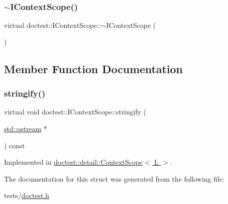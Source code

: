 \subsubsection{\texorpdfstring{$\sim$\+I\+Context\+Scope()}{~IContextScope()}}
{\footnotesize\ttfamily virtual doctest\+::\+I\+Context\+Scope\+::$\sim$\+I\+Context\+Scope (\begin{DoxyParamCaption}{ }\end{DoxyParamCaption})\hspace{0.3cm}{\ttfamily [virtual]}}



\subsection{Member Function Documentation}
\mbox{\label{structdoctest_1_1IContextScope_affbf0f9bf8107a4a8a805d237288141d}} 
\subsubsection{\texorpdfstring{stringify()}{stringify()}}
{\footnotesize\ttfamily virtual void doctest\+::\+I\+Context\+Scope\+::stringify (\begin{DoxyParamCaption}\item[{\hyperlink{doctest_8h_a116af65cb5e924b33ad9d9ecd7a783f3}{std\+::ostream} $\ast$}]{ }\end{DoxyParamCaption}) const\hspace{0.3cm}{\ttfamily [pure virtual]}}



Implemented in \hyperlink{classdoctest_1_1detail_1_1ContextScope_a4636ac32ae41ae108c7ada4a164ffaeb}{doctest\+::detail\+::\+Context\+Scope$<$ L $>$}.



The documentation for this struct was generated from the following file\+:\begin{DoxyCompactItemize}
\item 
tests/\hyperlink{doctest_8h}{doctest.\+h}\end{DoxyCompactItemize}
